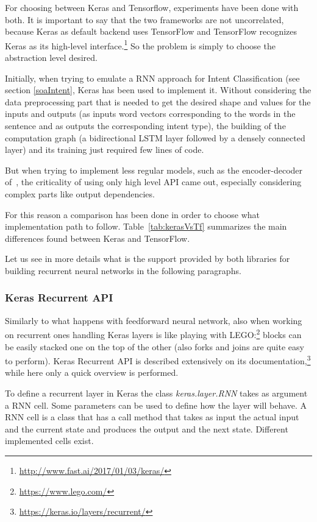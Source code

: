 For choosing between Keras and Tensorflow, experiments have been done with both. It is important to say that the two frameworks are not uncorrelated, because Keras as default backend uses TensorFlow and TensorFlow recognizes Keras as its high-level interface.\footnote{\url{http://www.fast.ai/2017/01/03/keras/}} So the problem is simply to choose the abstraction level desired.

Initially, when trying to emulate a RNN approach for Intent Classification (see section \ref{soaIntent}, Keras has been used to implement it. Without considering the data preprocessing part that is needed to get the desired shape and values for the inputs and outputs (as inputs word vectors corresponding to the words in the sentence and as outputs the corresponding intent type), the building of the computation graph (a bidirectional LSTM layer followed by a densely connected layer) and its training just required few lines of code.

But when trying to implement less regular models, such as the encoder-decoder of~\cite{liu2016attention}, the criticality of using only high level API came out, especially considering complex parts like output dependencies.

For this reason a comparison has been done in order to choose what implementation path to follow. Table~\ref{tab:kerasVsTf} summarizes the main differences found between Keras and TensorFlow.




Let us see in more details what is the support provided by both libraries for building recurrent neural networks in the following paragraphs.

\subsubsection{Keras Recurrent API}
Similarly to what happens with feedforward neural network, also when working on recurrent ones handling Keras layers is like playing with LEGO:\footnote{\url{https://www.lego.com/}} blocks can be easily stacked one on the top of the other (also forks and joins are quite easy to perform). Keras Recurrent API is described extensively on its documentation,\footnote{\url{https://keras.io/layers/recurrent/}} while here only a quick overview is performed.

To define a recurrent layer in Keras the class \textit{keras.layer.RNN} takes as argument a RNN cell. Some parameters can be used to define how the layer will behave. A RNN cell is a class that has a call method that takes as input the actual input and the current state and produces the output and the next state. Different implemented cells exist.

